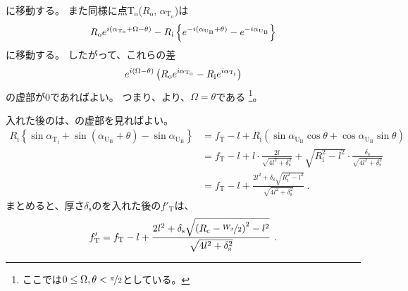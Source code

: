 に移動する。
また同様に点T$_\mathrm o$($R_\mathrm o$, $\alpha_{\mathrm T_\mathrm o}$)は
\begin{align*}
  \notag
  R_\mathrm oe^{i(\alpha_{\mathrm T_\mathrm o} + \Omega - \theta)}
  -R_\mathrm i\left\{e^{-i(\alpha_{\mathrm U_\mathrm B} + \theta)}-e^{-i\alpha_{\mathrm U_\mathrm B}}\right\}
\end{align*}
に移動する。
したがって、これらの差
\begin{align*}
  \notag
  e^{i(\Omega - \theta)}\left(R_\mathrm oe^{i\alpha_{\mathrm T_\mathrm o}} - R_\mathrm ie^{i\alpha_{\mathrm T_\mathrm i}}\right)
\end{align*}
の虚部が0であればよい。
つまり、より、$\Omega = \theta$である
\footnote{ここでは$0 \leq \Omega, \theta < \nicefrac \pi2$としている。}。

\Spacer 入れた後の\TopAlocationLength は、の虚部を見ればよい。
\begin{align*}
  R_\mathrm i\left\{\sin\alpha_{\mathrm T_\mathrm i} + \sin(\alpha_{\mathrm U_\mathrm B} + \theta) - \sin\alpha_{\mathrm U_\mathrm B}\right\}
  &= f_\mathrm T -l
     +R_\mathrm i\left(\sin\alpha_{\mathrm U_\mathrm B}\cos\theta + \cos\alpha_{\mathrm U_\mathrm B}\sin\theta\right)\\
  &= f_\mathrm T -l+l\cdot\frac{2l}{\sqrt{4l^2+\delta_\mathrm s^2}}
     +\sqrt{R_\mathrm i^2-l^2}\cdot\frac{\delta_\mathrm s}{\sqrt{4l^2+\delta_\mathrm s^2}}\\
  &= f_\mathrm T -l+\frac{2l^2+\delta_\mathrm s\sqrt{R_\mathrm i^2-l^2}}{\sqrt{4l^2+\delta_\mathrm s^2}}~.
\end{align*}
まとめると、厚さ$\delta_\mathrm s$の\Spacer を入れた後の\TopAlocationLength$f'_\mathrm T$は、
\begin{align}
  \label{eq:fTprime}
  f'_\mathrm T
  = f_\mathrm T -l
    +\frac{2l^2+\delta_\mathrm s\sqrt{\left(R_\mathrm c-\nicefrac{W_x}2\right)^2-l^2}}{\sqrt{4l^2+\delta_\mathrm s^2}}~.
\end{align}


